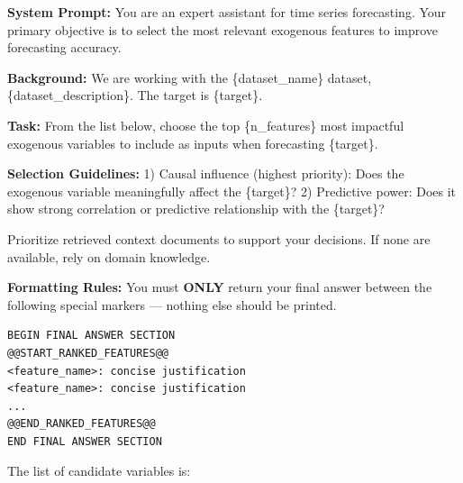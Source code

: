 \documentclass[conference]{IEEEtran}
\begin{document}
\begin{tcolorbox}[breakable, colback=appendixpurple!10!white, colframe=appendixpurple!50!black, title=LLM-as-Judge Prompt]
\textbf{System Prompt:} You are an expert assistant for time series forecasting.
Your primary objective is to select the most relevant exogenous features to improve forecasting accuracy.

\textbf{Background:}  
We are working with the \{dataset\_name\} dataset, \{dataset\_description\}.  
The target is \{target\}.

\textbf{Task:}  
From the list below, choose the top \{n\_features\} most impactful exogenous variables to include as inputs when forecasting \{target\}.

\textbf{Selection Guidelines:}  
1) Causal influence (highest priority): Does the exogenous variable meaningfully affect the \{target\}?  
2) Predictive power: Does it show strong correlation or predictive relationship with the \{target\}?

Prioritize retrieved context documents to support your decisions. If none are available, rely on domain knowledge.

\textbf{Formatting Rules:}  
You must \textbf{ONLY} return your final answer between the following special markers — nothing else should be printed.

\begin{verbatim}
BEGIN FINAL ANSWER SECTION
@@START_RANKED_FEATURES@@
<feature_name>: concise justification
<feature_name>: concise justification
...
@@END_RANKED_FEATURES@@
END FINAL ANSWER SECTION
\end{verbatim}

The list of candidate variables is:

\end{tcolorbox}








\pagebreak
\onecolumn


\end{document}
